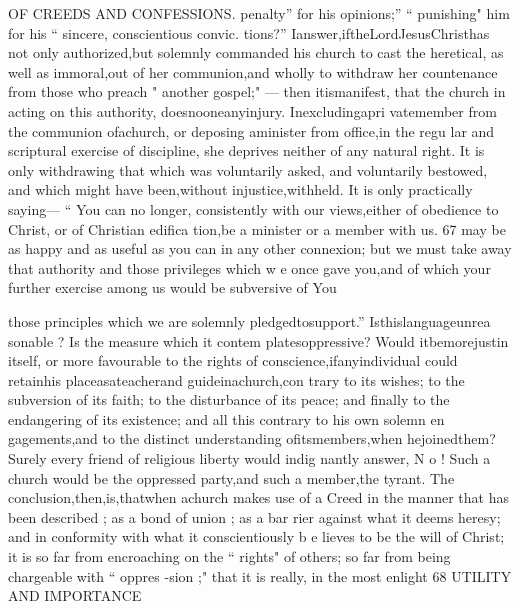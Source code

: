 \documentclass[
]{book}
\begin{document}
OF CREEDS AND CONFESSIONS.
penalty'' for his opinions;'' `` punishing" him for his `` sincere, conscientious convic. tions?'' Ianswer,iftheLordJesusChristhas not only authorized,but solemnly commanded
his church to cast the heretical, as well as
immoral,out of her communion,and wholly to withdraw her countenance from those who
preach " another gospel;" --- then itismanifest,
that the church in acting on this authority, doesnooneanyinjury. Inexcludingapri vatemember from the communion ofachurch, or deposing aminister from office,in the regu lar and scriptural exercise of discipline, she deprives neither of any natural right. It is
only withdrawing that which was voluntarily asked, and voluntarily bestowed, and which
might have been,without injustice,withheld. It is only practically saying--- `` You can no longer, consistently with our views,either of obedience to Christ, or of Christian edifica tion,be a minister or a member with us.
67
may be as happy and as useful as you can in
any other connexion; but we must take away that authority and those privileges which w e once gave you,and of which your further exercise among us would be subversive of
You

those principles which we are solemnly pledgedtosupport.'' Isthislanguageunrea sonable ? Is the measure which it contem
platesoppressive? Would itbemorejustin itself, or more favourable to the rights of conscience,ifanyindividual could retainhis
placeasateacherand guideinachurch,con trary to its wishes; to the subversion of its
faith; to the disturbance of its peace; and finally to the endangering of its existence; and all this contrary to his own solemn en gagements,and to the distinct understanding
ofitsmembers,when hejoinedthem?Surely every friend of religious liberty would indig nantly answer, N o ! Such a church would be
the oppressed party,and such a member,the tyrant.
The conclusion,then,is,thatwhen achurch makes use of a Creed in the manner that has
been described ; as a bond of union ; as a bar rier against what it deems heresy; and in conformity with what it conscientiously b e lieves to be the will of Christ; it is so far from encroaching on the `` rights" of others; so far from being chargeable with `` oppres
-sion ;" that it is really, in the most enlight
68 UTILITY AND IMPORTANCE
\end{document}
